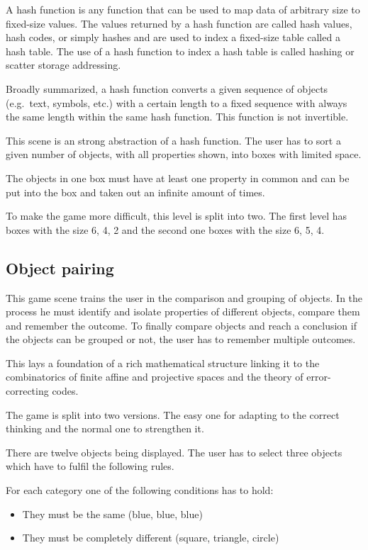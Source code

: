 A hash function is any function that can be used to map data of arbitrary size to fixed-size values.
The values returned by a hash function are called hash values, hash codes, or simply hashes and
are used to index a fixed-size table called a hash table.
The use of a hash function to index a hash table is called hashing or scatter storage addressing.\cite{artofcomputerscience}

Broadly summarized, a hash function converts a given sequence of objects (e.g.\ text, symbols, etc.)
with a certain length to a fixed sequence with always the same length within the same hash function.
This function is not invertible.

This scene is an strong abstraction of a hash function.
The user has to sort a given number of objects, with all properties shown, into boxes with limited space.

The objects in one box must have at least one property in common and
can be put into the box and taken out an infinite amount of times.

To make the game more difficult, this level is split into two.
The first level has boxes with the size 6, 4, 2 and the second one boxes with the size 6, 5, 4.

\subsection{Object pairing}\label{subsec:object-pairing}
This game scene trains the user in the comparison and grouping of objects.
In the process he must identify and isolate properties of different objects, compare them and remember the outcome.
To finally compare objects and reach a conclusion if the objects can be grouped or not,
the user has to remember multiple outcomes.

This lays a foundation of a rich mathematical structure linking it to the combinatorics of finite affine and
projective spaces and the theory of error-correcting codes.\cite{cardgameset}

The game is split into two versions. The easy one for adapting to the correct thinking
and the normal one to strengthen it.

There are twelve objects being displayed.
The user has to select three objects which have to fulfil the following rules.

For each category one of the following conditions has to hold:
\begin{itemize}
    \item They must be the same (blue, blue, blue)
    \item They must be completely different (square, triangle, circle)
\end{itemize}

